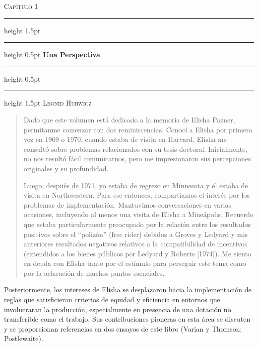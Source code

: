 \documentclass[12pt, letterpaper]{article}
\newenvironment{reminiscence}{%
    \itshape\color{black!85}%
    \begin{quote}%
}{%
    \end{quote}%
}
\begin{document}
\begin{center}
    \vspace*{1cm}
    {\color{SlateGray}\textsc{Capítulo 1}} \\
    \vspace{0.4cm}
    \hrule height 1.5pt
    \vspace{0.2cm}
    \hrule height 0.5pt
    \vspace{0.6cm}
    {\huge\bfseries\color{MidnightBlue} Una Perspectiva} \\
    \vspace{0.6cm}
    \hrule height 0.5pt
    \vspace{0.2cm}
    \hrule height 1.5pt
    \vspace{0.8cm}
    {\Large\scshape Leonid Hurwicz} \\
    \vspace{1.5cm}
\end{center}


\begin{reminiscence}
Dado que este volumen está dedicado a la memoria de Elisha Pazner, permítanme comenzar con dos reminiscencias. Conocí a Elisha por primera vez en 1969 o 1970, cuando estaba de visita en Harvard. Elisha me consultó sobre problemas relacionados con su tesis doctoral. Inicialmente, no nos resultó fácil comunicarnos, pero me impresionaron sus percepciones originales y su profundidad.

Luego, después de 1971, yo estaba de regreso en Minnesota y él estaba de visita en Northwestern. Para ese entonces, compartíamos el interés por los problemas de implementación. Mantuvimos conversaciones en varias ocasiones, incluyendo al menos una visita de Elisha a Mineápolis. Recuerdo que estaba particularmente preocupado por la relación entre los resultados positivos sobre el ``polizón'' (free rider) debidos a Groves y Ledyard y mis anteriores resultados negativos relativos a la compatibilidad de incentivos (extendidos a los bienes públicos por Ledyard y Roberts [1974]). Me siento en deuda con Elisha tanto por el estímulo para perseguir este tema como por la aclaración de muchos puntos esenciales.
\end{reminiscence}

\medskip

Posteriormente, los intereses de Elisha se desplazaron hacia la implementación de reglas que satisficieran criterios de equidad y eficiencia en entornos que involucraran la producción, especialmente en presencia de una dotación no transferible como el trabajo. Sus contribuciones pioneras en esta área se discuten y se proporcionan referencias en dos ensayos de este libro (Varian y Thomson; Postlewaite).
\end{document}
